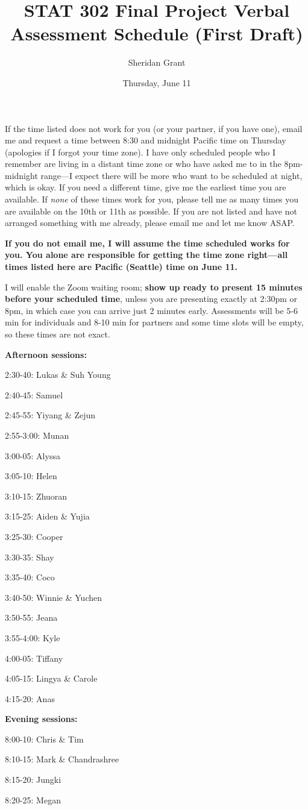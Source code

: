 \documentclass[12pt]{article}
\title{STAT 302 Final Project Verbal Assessment Schedule (First Draft)}
\author{Sheridan Grant}
\date{Thursday, June 11}
\begin{document}
\sloppy

\maketitle

If the time listed does not work for you (or your partner, if you have one), email me and request a time between 8:30 and midnight Pacific time on Thursday (apologies if I forgot your time zone). I have only scheduled people who I remember are living in a distant time zone or who have asked me to in the 8pm-midnight range---I expect there will be more who want to be scheduled at night, which is okay. If you need a different time, give me the earliest time you are available. If \textit{none} of these times work for you, please tell me as many times you are available on the 10th or 11th as possible. If you are not listed and have not arranged something with me already, please email me and let me know ASAP.

\textbf{If you do not email me, I will assume the time scheduled works for you. You alone are responsible for getting the time zone right---all times listed here are Pacific (Seattle) time on June 11.}

I will enable the Zoom waiting room; \textbf{show up ready to present 15 minutes before your scheduled time}, unless you are presenting exactly at 2:30pm or 8pm, in which case you can arrive just 2 minutes early. Assessments will be 5-6 min for individuals and 8-10 min for partners and some time slots will be empty, so these times are not exact.

\begin{multicols}{2}

\textbf{Afternoon sessions:}

2:30-40: Lukas \& Suh Young 

2:40-45: Samuel 

2:45-55: Yiyang \& Zejun 

2:55-3:00: Munan 

3:00-05: Alyssa 

3:05-10: Helen 

3:10-15: Zhuoran 

3:15-25: Aiden \& Yujia 

3:25-30: Cooper 

3:30-35: Shay 

3:35-40: Coco 

3:40-50: Winnie \& Yuchen 

3:50-55: Jeana 

3:55-4:00: Kyle 

4:00-05: Tiffany 

4:05-15: Lingya \& Carole 

4:15-20: Anas

\textbf{Evening sessions:}

8:00-10: Chris \& Tim 

8:10-15: Mark \& Chandrashree 

8:15-20: Jungki 

8:20-25: Megan

\end{multicols}
\end{document}
